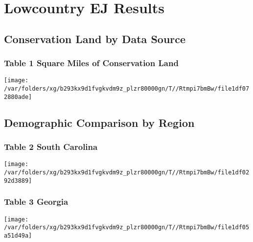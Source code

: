 \documentclass[landscape]{article}
\author{}
\date{\vspace{-2.5em}}
\begin{document}
\hypertarget{lowcountry-ej-results}{%
\section{Lowcountry EJ Results}\label{lowcountry-ej-results}}

\hypertarget{conservation-land-by-data-source}{%
\subsection{Conservation Land by Data
Source}\label{conservation-land-by-data-source}}

\hypertarget{table-1-square-miles-of-conservation-land}{%
\subsubsection{Table 1 Square Miles of Conservation
Land}\label{table-1-square-miles-of-conservation-land}}

\texttt{[image: /var/folders/xg/b293kx9d1fvgkvdm9z\_plzr80000gn/T//Rtmpi7bmBw/file1df072880ade]}

\hypertarget{demographic-comparison-by-region}{%
\subsection{Demographic Comparison by
Region}\label{demographic-comparison-by-region}}

\hypertarget{table-2-south-carolina}{%
\subsubsection{Table 2 South Carolina}\label{table-2-south-carolina}}

\texttt{[image: /var/folders/xg/b293kx9d1fvgkvdm9z\_plzr80000gn/T//Rtmpi7bmBw/file1df0292d3889]}

\hypertarget{table-3-georgia}{%
\subsubsection{Table 3 Georgia}\label{table-3-georgia}}

\texttt{[image: /var/folders/xg/b293kx9d1fvgkvdm9z\_plzr80000gn/T//Rtmpi7bmBw/file1df05a51d49a]}
\end{document}
